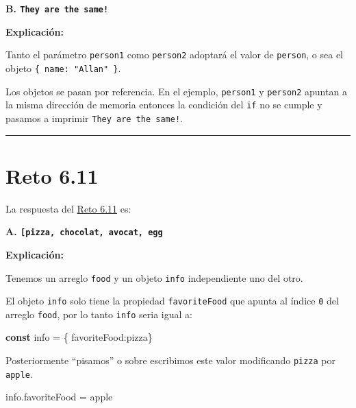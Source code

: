\documentclass[
  letterpaper,
  DIV=11,
  numbers=noendperiod]{scrreprt}
\newenvironment{Shaded}{\begin{snugshade}}{\end{snugshade}}
\newcommand{\AttributeTok}[1]{\textcolor[rgb]{0.40,0.45,0.13}{#1}}
\newcommand{\DataTypeTok}[1]{\textcolor[rgb]{0.68,0.00,0.00}{#1}}
\newcommand{\KeywordTok}[1]{\textcolor[rgb]{0.00,0.23,0.31}{\textbf{#1}}}
\newcommand{\NormalTok}[1]{\textcolor[rgb]{0.00,0.23,0.31}{#1}}
\newcommand{\OperatorTok}[1]{\textcolor[rgb]{0.37,0.37,0.37}{#1}}
\newcommand{\StringTok}[1]{\textcolor[rgb]{0.13,0.47,0.30}{#1}}
\begin{document}
\textbf{B. \texttt{They\ are\ the\ same!}}

\textbf{Explicación:}

Tanto el parámetro \texttt{person1} como \texttt{person2} adoptará el
valor de \texttt{person}, o sea el objeto
\texttt{\{\ name:\ "Allan"\ \}}.

Los objetos se pasan por referencia. En el ejemplo, \texttt{person1} y
\texttt{person2} apuntan a la misma dirección de memoria entonces la
condición del \texttt{if} no se cumple y pasamos a imprimir
\texttt{They\ are\ the\ same!}.

\begin{center}\rule{0.5\linewidth}{0.5pt}\end{center}

\section{Reto 6.11}\label{sec-sol-cap6-reto11}

La respuesta del \hyperref[sec-cap6-reto11]{Reto 6.11} es:

\textbf{A.
\texttt{{[}\textquotesingle{}pizza\textquotesingle{},\ \textquotesingle{}chocolat\textquotesingle{},\ \textquotesingle{}avocat\textquotesingle{},\ \textquotesingle{}egg\textquotesingle{}{]}}}

\textbf{Explicación:}

Tenemos un arreglo \texttt{food} y un objeto \texttt{info} independiente
uno del otro.

El objeto \texttt{info} solo tiene la propiedad \texttt{favoriteFood}
que apunta al índice \texttt{0} del arreglo \texttt{food}, por lo tanto
\texttt{info} seria igual a:

\begin{Shaded}
\begin{Highlighting}[]
\KeywordTok{const}\NormalTok{ info }\OperatorTok{=}\NormalTok{ \{ }\DataTypeTok{favoriteFood}\OperatorTok{:}\StringTok{\textquotesingle{}pizza\textquotesingle{}}\NormalTok{\}}
\end{Highlighting}
\end{Shaded}

Posteriormente ``pisamos'' o sobre escribimos este valor modificando
\texttt{\textquotesingle{}pizza\textquotesingle{}} por
\texttt{\textquotesingle{}apple\textquotesingle{}}.

\begin{Shaded}
\begin{Highlighting}[]
\NormalTok{info}\OperatorTok{.}\AttributeTok{favoriteFood} \OperatorTok{=} \StringTok{\textquotesingle{}apple\textquotesingle{}}
\end{Highlighting}
\end{Shaded}
\end{document}
